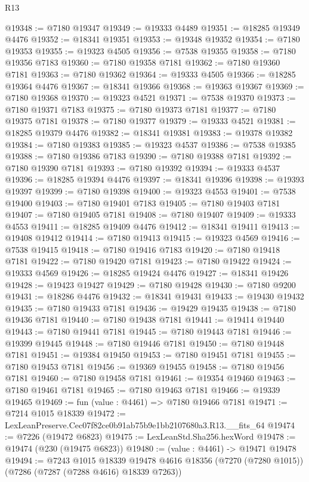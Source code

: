 \begin{lexlean}{R13}
\begin{coremodule}
@19348 := @7180 @19347
@19349 := @19333 @4489
@19351 := @18285 @19349 @4476
@19352 := @18341 @19351
@19353 := @19348 @19352
@19354 := @7180 @19353
@19355 := @19323 @4505
@19356 := @7538 @19355
@19358 := @7180 @19356 @7183
@19360 := @7180 @19358 @7181
@19362 := @7180 @19360 @7181
@19363 := @7180 @19362
@19364 := @19333 @4505
@19366 := @18285 @19364 @4476
@19367 := @18341 @19366
@19368 := @19363 @19367
@19369 := @7180 @19368
@19370 := @19323 @4521
@19371 := @7538 @19370
@19373 := @7180 @19371 @7183
@19375 := @7180 @19373 @7181
@19377 := @7180 @19375 @7181
@19378 := @7180 @19377
@19379 := @19333 @4521
@19381 := @18285 @19379 @4476
@19382 := @18341 @19381
@19383 := @19378 @19382
@19384 := @7180 @19383
@19385 := @19323 @4537
@19386 := @7538 @19385
@19388 := @7180 @19386 @7183
@19390 := @7180 @19388 @7181
@19392 := @7180 @19390 @7181
@19393 := @7180 @19392
@19394 := @19333 @4537
@19396 := @18285 @19394 @4476
@19397 := @18341 @19396
@19398 := @19393 @19397
@19399 := @7180 @19398
@19400 := @19323 @4553
@19401 := @7538 @19400
@19403 := @7180 @19401 @7183
@19405 := @7180 @19403 @7181
@19407 := @7180 @19405 @7181
@19408 := @7180 @19407
@19409 := @19333 @4553
@19411 := @18285 @19409 @4476
@19412 := @18341 @19411
@19413 := @19408 @19412
@19414 := @7180 @19413
@19415 := @19323 @4569
@19416 := @7538 @19415
@19418 := @7180 @19416 @7183
@19420 := @7180 @19418 @7181
@19422 := @7180 @19420 @7181
@19423 := @7180 @19422
@19424 := @19333 @4569
@19426 := @18285 @19424 @4476
@19427 := @18341 @19426
@19428 := @19423 @19427
@19429 := @7180 @19428
@19430 := @7180 @9200
@19431 := @18286 @4476
@19432 := @18341 @19431
@19433 := @19430 @19432
@19435 := @7180 @19433 @7181
@19436 := @19429 @19435
@19438 := @7180 @19436 @7181
@19440 := @7180 @19438 @7181
@19441 := @19414 @19440
@19443 := @7180 @19441 @7181
@19445 := @7180 @19443 @7181
@19446 := @19399 @19445
@19448 := @7180 @19446 @7181
@19450 := @7180 @19448 @7181
@19451 := @19384 @19450
@19453 := @7180 @19451 @7181
@19455 := @7180 @19453 @7181
@19456 := @19369 @19455
@19458 := @7180 @19456 @7181
@19460 := @7180 @19458 @7181
@19461 := @19354 @19460
@19463 := @7180 @19461 @7181
@19465 := @7180 @19463 @7181
@19466 := @19339 @19465
@19469 := fun (value : @4461) => @7180 @19466 @7181
@19471 := @7214 @1015 @18339
@19472 := LexLeanPreserve.Cec07f82ce0b91ab75b9e1bb2107680a3.R13.__fits_64
@19474 := @7226 (@19472 @6823)
@19475 := LexLeanStd.Sha256.hexWord
@19478 := @19474 (@230 (@19475 @6823))
@19480 := (value : @4461) -> @19471 @19478
@19494 := @7243
    @1015
    @18339
    @19478
    @4616
    @18356
    (@7270 (@7280 @1015))
    (@7286 (@7287 (@7288 @4616) @18339 @7263))

\end{coremodule}
\end{lexlean}
